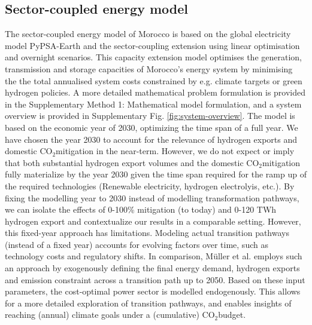 \documentclass[5p,numafflabel]{elsarticle}
\newcommand{\co}{\ce{CO2}~}
\def\co{CO${}_2${\:}}
\begin{document}
\subsection*{Sector-coupled energy model}
\label{subsec:moroccan_model}
The sector-coupled energy model of Morocco is based on the global electricity model  PyPSA-Earth \cite{Parzen2023} and the sector-coupling extension \cite{Abdel-Khalek2025} using linear optimisation and overnight scenarios. This capacity extension model optimises the generation, transmission and storage capacities of Morocco's energy system by minimising the the total annualised system costs constrained by e.g. climate targets or green hydrogen policies.
A more detailed mathematical problem formulation is provided in the Supplementary Method 1: Mathematical model formulation,
and a system overview is provided in Supplementary Fig. \ref{fig:system-overview}.
The model is based on the economic year of 2030, optimizing the time span of a full year. We have chosen the year 2030 to account for the relevance of hydrogen exports and domestic \co mitigation in the near-term. However, we do not expect or imply that both substantial hydrogen export volumes and the domestic \co mitigation fully materialize by the year 2030 given the time span required for the ramp up of the required technologies (Renewable electricity, hydrogen electrolyis, etc.). By fixing the modelling year to 2030 instead of modelling transformation pathways, we can isolate the effects of 0-100\% mitigation (to today) and 0-120 TWh hydrogen export and contextualize our results in a comparable setting.
However, this fixed-year approach has limitations. Modeling actual transition pathways (instead of a fixed year) accounts for evolving factors over time, such as technology costs and regulatory shifts. 
In comparison, M\"uller et al.\cite{Muller2024} employs such an  approach by exogenously defining the final energy demand, hydrogen exports and emission constraint across a transition path up to 2050. Based on these input parameters, the cost-optimal power sector is modelled endogenously. This allows for a more detailed exploration of transition pathways, and enables insights of reaching (annual) climate goals under a (cumulative) \co budget.
\end{document}
